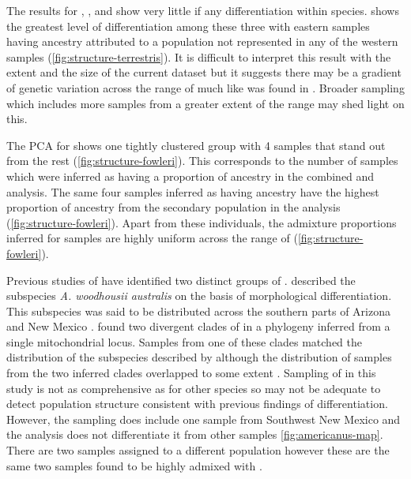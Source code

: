 The \structure results for \fowl, \terr, and \wood show very little if any
differentiation within species.
\terr shows the greatest level of differentiation among these three with 
eastern samples having ancestry attributed to a population not represented 
in any of the western samples (\cref{fig:structure-terrestris}). 
It is difficult to interpret this result with the extent and the size of the 
current dataset but it suggests there may be a gradient of genetic variation
across the range of \terr much like was found in \amer. 
Broader sampling which includes more samples from a greater extent of the \terr
range may shed light on this.  

The PCA for \fowl shows one tightly clustered group with 4 samples that 
stand out from the rest (\cref{fig:structure-fowleri}).
This corresponds to the number of samples which were inferred as having 
a proportion of \wood ancestry in the combined \fowl and \wood \structure 
analysis. 
The same four samples inferred as having \wood ancestry have the highest 
proportion of ancestry from the secondary population in the \fowl \structure 
analysis (\cref{fig:structure-fowleri}).
Apart from these individuals, the admixture proportions inferred for \fowl 
samples are highly uniform across the range of \fowl (\cref{fig:structure-fowleri}).  

Previous studies of \wood have identified two distinct groups of \wood. 
\cite{shannon1955} described the subspecies \textit{A. woodhousii australis} 
on the basis of morphological differentiation.
This subspecies was said to be distributed across the southern parts of Arizona
and New Mexico \parencite{shannon1955}. 
\cite{masta2003} found two divergent clades of \wood in a phylogeny inferred 
from a single mitochondrial locus. 
Samples from one of these clades matched the distribution of the subspecies described 
by although the distribution of samples from the two inferred clades 
overlapped to some extent \cite{shannon1955,masta2003}.
Sampling of \wood in this study is not as comprehensive as for other species
so may not be adequate to detect population structure consistent with 
previous findings of differentiation. 
However, the sampling does include one sample from Southwest New Mexico 
and the \structure analysis does not differentiate it from other samples \cref{fig:americanus-map}.
There are two samples assigned to a different population however these are the 
same two samples found to be highly admixed with \fowl. 



